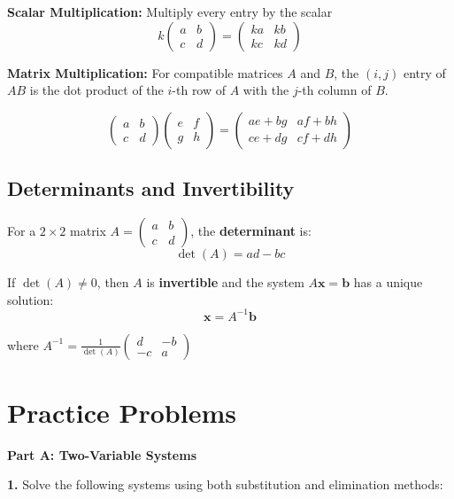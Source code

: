\documentclass[12pt]{article}
\begin{document}
\textbf{Scalar Multiplication:} Multiply every entry by the scalar
$$k \begin{pmatrix} a & b \\ c & d \end{pmatrix} = \begin{pmatrix} ka & kb \\ kc & kd \end{pmatrix}$$

\textbf{Matrix Multiplication:} For compatible matrices $A$ and $B$, the $(i,j)$ entry of $AB$ is the dot product of the $i$-th row of $A$ with the $j$-th column of $B$.

$$\begin{pmatrix} a & b \\ c & d \end{pmatrix} \begin{pmatrix} e & f \\ g & h \end{pmatrix} = \begin{pmatrix} ae+bg & af+bh \\ ce+dg & cf+dh \end{pmatrix}$$

\subsection{Determinants and Invertibility}

For a $2 \times 2$ matrix $A = \begin{pmatrix} a & b \\ c & d \end{pmatrix}$, the \textbf{determinant} is:
$$\det(A) = ad - bc$$

If $\det(A) \neq 0$, then $A$ is \textbf{invertible} and the system $A\mathbf{x} = \mathbf{b}$ has a unique solution:
$$\mathbf{x} = A^{-1}\mathbf{b}$$

where $A^{-1} = \frac{1}{\det(A)} \begin{pmatrix} d & -b \\ -c & a \end{pmatrix}$

\newpage

\section{Practice Problems}

\textbf{Part A: Two-Variable Systems}

\textbf{1.} Solve the following systems using both substitution and elimination methods:
\end{document}
